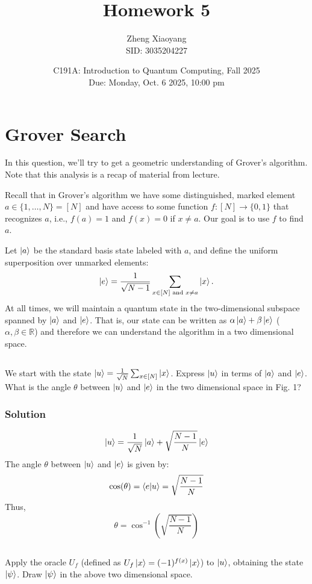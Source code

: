 \documentclass[12pt]{article} %
\title{Homework 5}
\author{Zheng Xiaoyang \\ SID: 3035204227}
\date{C191A: Introduction to Quantum Computing, Fall 2025 \\ Due: Monday, Oct. 6 2025, 10:00 pm}
\begin{document}
\maketitle %

\section{Grover Search}

In this question, we'll try to get a geometric understanding of Grover's algorithm. Note that this analysis is a recap of material from lecture.

Recall that in Grover's algorithm we have some distinguished, marked element \(a \in \{1, \dots, N\} = [N]\) and have access to some function \(f : [N] \to \{0,1\}\) that recognizes \(a\), i.e., \(f(a) = 1\) and \(f(x) = 0\) if \(x \ne a\). Our goal is to use \(f\) to find \(a\).

Let \(\ket{a}\) be the standard basis state labeled with \(a\), and define the uniform superposition over unmarked elements:
\[ \ket{e} = \frac{1}{\sqrt{N-1}} \sum_{x \in [N] \text{ and } x \ne a} \ket{x}. \]
At all times, we will maintain a quantum state in the two-dimensional subspace spanned by \(\ket{a}\) and \(\ket{e}\). That is, our state can be written as \(\alpha \ket{a} + \beta \ket{e}\) (\(\alpha, \beta \in \mathbb{R}\)) and therefore we can understand the algorithm in a two dimensional space.

\subsection{}
We start with the state \(\ket{u} = \frac{1}{\sqrt{N}} \sum_{x \in [N]} \ket{x}\). Express \(\ket{u}\) in terms of \(\ket{a}\) and \(\ket{e}\). What is the angle \(\theta\) between \(\ket{u}\) and \(\ket{e}\) in the two dimensional space in Fig. 1?
\subsubsection*{Solution}
\[\ket{u} = \frac{1}{\sqrt{N}} \ket{a} + \sqrt{\frac{N-1}{N}} \ket{e}\]
The angle \(\theta\) between \(\ket{u}\) and \(\ket{e}\) is given by:
\[\cos(\theta) = \braket{e|u} = \sqrt{\frac{N-1}{N}}\]
Thus,
\[\theta = \cos^{-1}\left(\sqrt{\frac{N-1}{N}}\right)\] 
\subsection{}
Apply the oracle \(U_f\) (defined as \(U_f\ket{x} = (-1)^{f(x)}\ket{x}\)) to \(\ket{u}\), obtaining the state \(\ket{\psi}\). Draw \(\ket{\psi}\) in the above two dimensional space.
\end{document}

